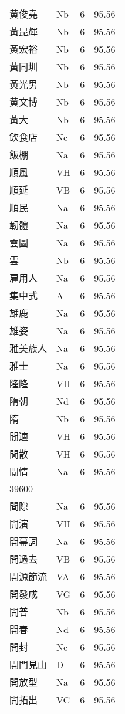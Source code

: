 \documentclass[twocolumn]{book}
\begin{document}
\begin{supertabular}{llrr}
黃俊堯 & Nb & 6 &  95.56\\
黃昆輝 & Nb & 6 &  95.56\\
黃宏裕 & Nb & 6 &  95.56\\
黃同圳 & Nb & 6 &  95.56\\
黃光男 & Nb & 6 &  95.56\\
黃文博 & Nb & 6 &  95.56\\
黃大 & Nb & 6 &  95.56\\
飲食店 & Nc & 6 &  95.56\\
飯棚 & Na & 6 &  95.56\\
順風 & VH & 6 &  95.56\\
順延 & VB & 6 &  95.56\\
順民 & Na & 6 &  95.56\\
韌體 & Na & 6 &  95.56\\
雲圖 & Na & 6 &  95.56\\
雲 & Nb & 6 &  95.56\\
雇用人 & Na & 6 &  95.56\\
集中式 & A & 6 &  95.56\\
雄鹿 & Na & 6 &  95.56\\
雄姿 & Na & 6 &  95.56\\
雅美族人 & Na & 6 &  95.56\\
雅士 & Na & 6 &  95.56\\
隆隆 & VH & 6 &  95.56\\
隋朝 & Nd & 6 &  95.56\\
隋 & Nb & 6 &  95.56\\
閒適 & VH & 6 &  95.56\\
閒散 & VH & 6 &  95.56\\
閒情 & Na & 6 &  95.56\\
39600\\
間隙 & Na & 6 &  95.56\\
開演 & VH & 6 &  95.56\\
開幕詞 & Na & 6 &  95.56\\
開過去 & VB & 6 &  95.56\\
開源節流 & VA & 6 &  95.56\\
開發成 & VG & 6 &  95.56\\
開普 & Nb & 6 &  95.56\\
開春 & Nd & 6 &  95.56\\
開封 & Nc & 6 &  95.56\\
開門見山 & D & 6 &  95.56\\
開放型 & Na & 6 &  95.56\\
開拓出 & VC & 6 &  95.56\\

\end{supertabular}
\end{document}
